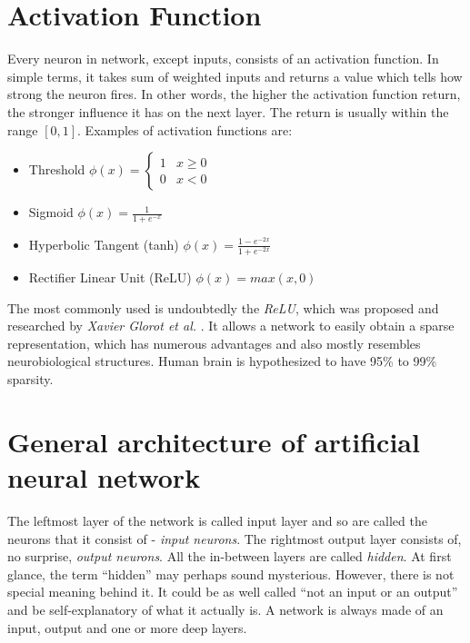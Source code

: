 \section{Activation Function}
\label{sec:activation-function}

Every neuron in network, except inputs, consists of an activation function. In simple terms, it takes sum of weighted inputs and returns a value which tells how strong the neuron fires. In other words, the higher the activation function return, the stronger influence it has on the next layer. The return is usually within the range $[0, 1]$. Examples of activation functions are: 
\begin{itemize}
    \item Threshold \hspace{5pt}
        $\phi(x) = 
        \begin{cases}
            1 & x \ge 0 \\
            0 & x<0
        \end{cases}$
    \item Sigmoid \hspace{5pt}
        $\phi(x) = \frac{1}{1+e^{-x}}$
    \item Hyperbolic Tangent (tanh) \hspace{5pt}
        $\phi(x) = \frac{1-e^{-2x}}{1+e^{-2x}}$
    \item Rectifier Linear Unit (ReLU) \hspace{5pt}
        $\phi(x) = max(x, 0)$
\end{itemize}

The most commonly used is undoubtedly the \emph{ReLU}, which was proposed and researched by \emph{Xavier Glorot et al.} \cite{DeepSparseReNN}. It allows a network to easily obtain a sparse representation, which has numerous advantages and also mostly resembles neurobiological structures. Human brain is hypothesized to have 95\% to 99\% sparsity.

\section{General architecture of artificial neural network}
\label{sec:general-architecture-ann}

The leftmost layer of the network is called input layer and so are called the neurons that it consist of - \emph{input neurons}. The rightmost output layer consists of, no surprise, \emph{output neurons}. All the in-between layers are called \emph{hidden}. At first glance, the term ``hidden'' may perhaps sound mysterious. However, there is not special meaning behind it. It could be as well called ``not an input or an output'' and be self-explanatory of what it actually is. A network is always made of an input, output and one or more deep layers.

